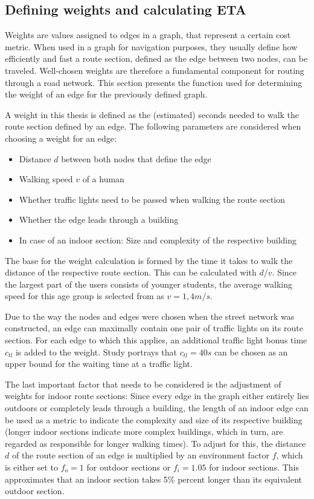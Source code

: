 \subsection{Defining weights and calculating ETA}
Weights are values assigned to edges in a graph, that represent a certain cost metric. When used in a graph for navigation purposes, they usually define how efficiently and fast a route section, defined as the edge between two nodes, can be traveled. Well-chosen weights are therefore a fundamental component for routing through a road network. This section presents the function used for determining the weight of an edge for the previously defined graph.

A weight in this thesis is defined as the (estimated) seconds needed to walk the route section defined by an edge. The following parameters are considered when choosing a weight for an edge:

\begin{itemize}
	\item Distance $d$ between both nodes that define the edge
	\item Walking speed $v$ of a human
	\item Whether traffic lights need to be passed when walking the route section
	\item Whether the edge leads through a building
	\item In case of an indoor section: Size and complexity of the respective building
\end{itemize}

The base for the weight calculation is formed by the time it takes to walk the distance of the respective route section. This can be calculated with $d / v$. Since the largest part of the users consists of younger students, the average walking speed for this age group is selected from \cite{average_walking_speed} as $v = 1,4 m/s$.

Due to the way the nodes and edges were chosen when the street network was constructed, an edge can maximally contain one pair of traffic lights on its route section. For each edge to which this applies, an additional traffic light bonus time $c_{tl}$ is added to the weight. Study \cite{traffic_light_waiting_time} portrays that $c_{tl} = 40 s$ can be chosen as an upper bound for the waiting time at a traffic light.

The last important factor that needs to be considered is the adjustment of weights for indoor route sections: Since every edge in the graph either entirely lies outdoors or completely leads through a building, the length of an indoor edge can be used as a metric to indicate the complexity and size of its respective building (longer indoor sections indicate more complex buildings, which in turn, are regarded as responsible for longer walking times). To adjust for this, the distance $d$ of the route section of an edge is multiplied by an environment factor $f$, which is either set to $f_{o} = 1$ for outdoor sections or $f_{i} = 1.05$ for indoor sections. This approximates that an indoor section takes 5\% percent longer than its equivalent outdoor section.

